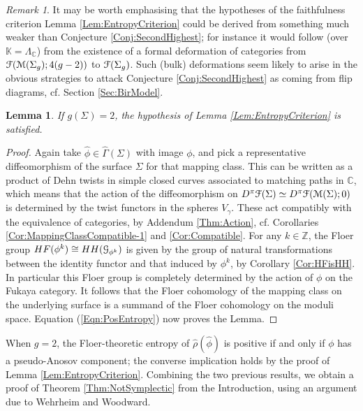 \documentclass[reqno,10pt]{amsart}
\numberwithin{equation}{section}
\newcommand{\bC}{{\mathbb C}}
\newcommand{\bK}{{\mathbb K}}
\newcommand{\bZ}{{\mathbb Z}}
\newcommand{\scrG}{\EuScript{G}}
\newcommand{\scrF}{\EuScript{F}}
\newcommand{\scrM}{\EuScript{M}}
\newtheorem{Lemma}[thm]{Lemma}
\theoremstyle{remark}
\newtheorem{Remark}[thm]{Remark}
\begin{document}
\begin{Remark}
It may be worth emphasising that the hypotheses of the faithfulness criterion Lemma \ref{Lem:EntropyCriterion} could be derived from something much weaker than Conjecture \ref{Conj:SecondHighest};  for instance it would follow (over $\bK = \Lambda_{\bC}$) from the existence of a formal deformation of categories from $\scrF(\scrM(\Sigma_g);4(g-2))$ to $\scrF(\Sigma_g)$. Such (bulk) deformations seem likely to arise in the obvious strategies to attack Conjecture \ref{Conj:SecondHighest} as coming from flip diagrams, cf. Section \ref{Sec:BirModel}. 
\end{Remark}

\begin{Lemma} \label{Lem:Genus2Case}
If $g(\Sigma) =2$, the hypothesis of Lemma \ref{Lem:EntropyCriterion} is satisfied.
\end{Lemma}

\begin{proof}
Again take $\hat\phi \in \widehat{\Gamma}(\Sigma)$ with image $\phi$, and pick a representative  diffeomorphism of the surface $\Sigma$ for that mapping class.  This can be written as a product of Dehn twists in simple closed curves associated to matching paths in $\bC$, which means that the action of the diffeomorphism on $D^{\pi}\scrF(\Sigma) \simeq D^{\pi}\scrF(\scrM(\Sigma);0)$ is determined by the twist functors in the spheres $V_{\gamma}$.  These act compatibly with the equivalence of categories, by Addendum \ref{Thm:Action}, cf. Corollaries \ref{Cor:MappingClassCompatible-1} and \ref{Cor:Compatible}. For any $k\in \bZ$, the Floer group $HF(\phi^k) \cong HH(\scrG_{\phi^k})$ is given by the group of natural transformations between the identity functor and that induced by $\phi^k$, by Corollary \ref{Cor:HFisHH}.   In particular this Floer group is completely determined by the action of $\phi$ on the Fukaya category.  It follows that  the Floer cohomology of the mapping class on the underlying surface is a summand of the Floer cohomology on the moduli space. Equation (\ref{Eqn:PosEntropy}) now proves the Lemma.  \end{proof}

When $g=2$, the Floer-theoretic entropy of $\hat\rho(\hat\phi)$ is positive if and only if $\phi$ has a pseudo-Anosov component; the converse implication holds by the proof of Lemma \ref{Lem:EntropyCriterion}.  Combining the two previous results, we obtain a proof of Theorem \ref{Thm:NotSymplectic} from the Introduction, using an argument due to Wehrheim and Woodward.
\end{document}
